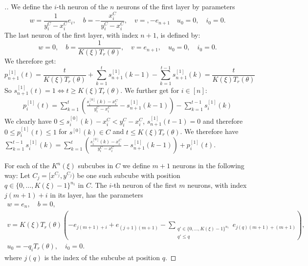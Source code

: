 \begin{proof}[.]
  We define the \(i\)-th neuron of the \(n\) neurons of the first layer by parameters
  \[ w=\frac{1}{y^C_i-x^C_i}e_i, \quad b=-\frac{x^C_i}{y^C_i-x^C_i}, \quad v=, -e_{n+1}\quad u_0=0, \quad i_0=0. \]
  The last neuron of the first layer, with index \(n+1\), is defined by:
  \begin{equation*}
    w=0, \quad b=\frac{1}{K(ξ)T_r(θ)}, \quad v=e_{n+1}, \quad u_0=0, \quad i_0=0.
  \end{equation*}
  We therefore get:
  \begin{equation*}
   p^{[1]}_{n+1}(t) = \frac{t}{K(ξ)T_r(θ)}+\sum_{k=1}^ts^{[1]}_{n+1}(k-1)-\sum_{k=1}^{t-1}s^{[1]}_{n+1}(k) = \frac{t}{K(ξ)T_r(θ)}
  \end{equation*}
  So \(s^{[1]}_{n+1}(t)=1⇔t≥K(ξ)T_r(θ)\).
  We further get for \(i∈[n]\):
  \begin{align*}
   p^{[1]}_i(t) = \sum_{k=1}^t\left(\frac{s_i^{[0]}(k)-x^C_i}{y^C_i-x^C_i}-s^{[1]}_{n+1}(k-1)\right)-\sum_{k=1}^{t-1}s_i^{[1]}(k)
  \end{align*}
  We clearly have \(0≤s_i^{[0]}(k)-x^C_i<y^C_i-x^C_i\), \(s^{[1]}_{n+1}(t-1)=0\) and therefore \(0≤p_i^{[1]}(t)≤1\) for \(s^{[0]}(k)∈C\) and \(t≤K(ξ)T_r(θ)\).
  We therefore have \(\sum_{k=1}^{t-1}s_i^{[1]}(k)=\sum_{k=1}^t\left(\frac{s_i^{[0]}(k)-x^C_i}{y^C_i-x^C_i}-s^{[1]}_{n+1}(k-1)\right)+p^{[1]}_i(t)\).





  For each of the \(K^n(ξ)\) subcubes in \(C\) we define \(m+1\) neurons in the following way:
  Let \(C_j=[x^{C_j},y^{C_j})\) be one such subcube with position \(q∈\{0,…,K(ξ)-1\}^{n_1}\) in \(C\).
  The \(i\)-th neuron of the first \(m\) neurons, with index \(j(m+1)+i\) in its layer, has the parameters
  \begin{gather*}
    w=e_n, \quad b=0, \\
    v=K(ξ)T_r(θ)\left(-e_{j(m+1)+i}+e_{(j+1)(m+1)}-\sum_{\substack{q'∈\{0,…,K(ξ)-1\}^{n_1} \\ q'≤q}}e_{j(q)(m+1)+(m+1)}\right), \\
    u_0=-q_iT_r(θ), \quad i_0=0.
  \end{gather*}
  where \(j(q)\) is the index of the subcube at position \(q\).


\end{proof}
